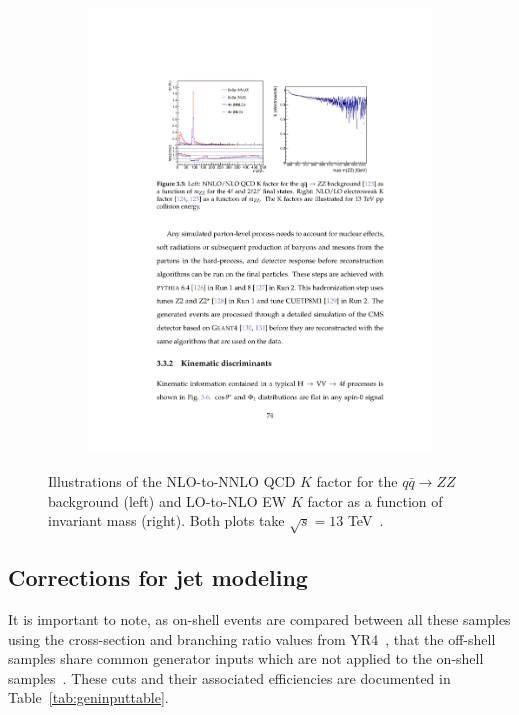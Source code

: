 \begin{figure}[!hbt]
\begin{subfigure}[t]{0.45\textwidth}
    \includegraphics[width=\textwidth]{figures/NLO_EW_Kfactor.pdf}
\end{subfigure}
\caption{Illustrations of the NLO-to-NNLO QCD $K$ factor for the $q\bar{q} \to ZZ$ background (left) and LO-to-NLO EW $K$ factor as a function of invariant mass (right). Both plots take $\sqrt{s}=13$ TeV~\cite{Grazzini_2015, PhysRevD.88.113005, gieseke2014vectorbosonpairproductionelectroweak}.}
\label{fig:qqbarEWKfactors}
\end{figure}

\subsection{Corrections for jet modeling} \label{sec:gencuts}

It is important to note, as on-shell events are compared between all these samples using the cross-section and branching ratio values from YR4~\cite{YellowRep4}, that the off-shell samples share common generator inputs which are not applied to the on-shell samples~\cite{YellowRep4}. These cuts and their associated efficiencies are documented in Table~\ref{tab:geninputtable}.

